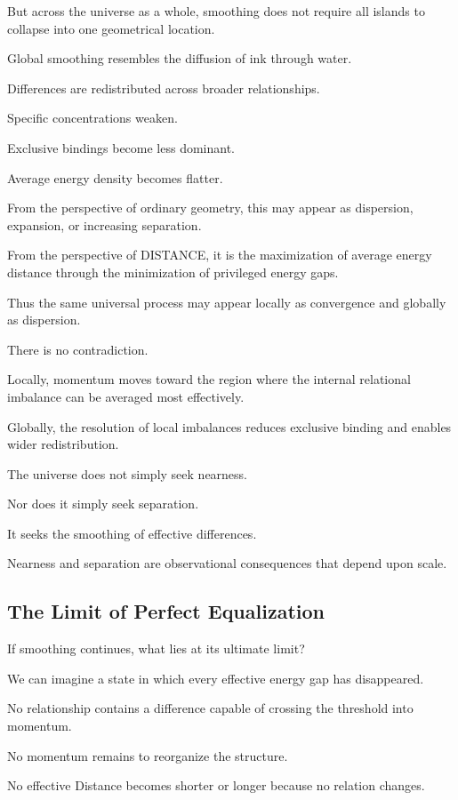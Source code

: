 But across the universe as a whole, smoothing does not require all islands to collapse into one geometrical location.

Global smoothing resembles the diffusion of ink through water.

Differences are redistributed across broader relationships.

Specific concentrations weaken.

Exclusive bindings become less dominant.

Average energy density becomes flatter.

From the perspective of ordinary geometry, this may appear as dispersion, expansion, or increasing separation.

From the perspective of DISTANCE, it is the maximization of average energy distance through the minimization of privileged energy gaps.

Thus the same universal process may appear locally as convergence and globally as dispersion.

There is no contradiction.

Locally, momentum moves toward the region where the internal relational imbalance can be averaged most effectively.

Globally, the resolution of local imbalances reduces exclusive binding and enables wider redistribution.

The universe does not simply seek nearness.

Nor does it simply seek separation.

It seeks the smoothing of effective differences.

Nearness and separation are observational consequences that depend upon scale.

\subsection*{\textbf{The Limit of Perfect Equalization}}

If smoothing continues, what lies at its ultimate limit?

We can imagine a state in which every effective energy gap has disappeared.

No relationship contains a difference capable of crossing the threshold into momentum.

No momentum remains to reorganize the structure.

No effective Distance becomes shorter or longer because no relation changes.

